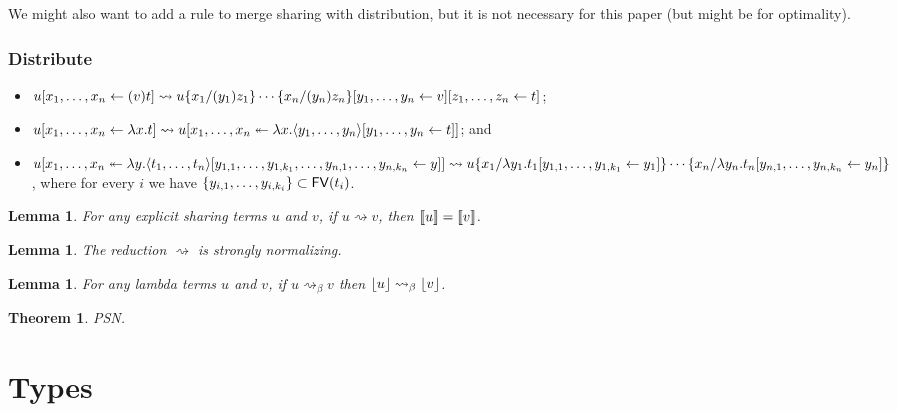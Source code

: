 \documentclass[10pt,a4paper]{article}
\theoremstyle{definition}
\theoremstyle{plain}
\newtheorem{lemma}[definition]{Lemma}
\newtheorem{theorem}[definition]{Theorem}
\theoremstyle{remark}
\begin{document}
We might also want to add a rule to merge sharing with distribution, but it is not necessary for this paper (but might be for optimality).

\subsubsection{Distribute}

\begin{itemize}
 \item ${ { {u}[{{x_1},\dots,{x_n}}\leftarrow{(v)t}] } } \rightsquigarrow {  { { {  { {{{u}\{{x_1}/{(y_1)z_1}\}\cdots\{{x_n}/{(y_n)z_n}\}}}[{{y_1},\dots,{y_n}}\leftarrow{v}] }  } }[{{z_1},\dots,{z_n}}\leftarrow{t}] }  }$;
 \item ${ { {u}[{{x_1},\dots,{x_n}}\leftarrow{\lambda x.t}] } } \rightsquigarrow {  { {u}[{{x_1},\dots,{x_n}}\twoheadleftarrow{\lambda{x}.{ {  { { { {\langle} {y_1},\dots,{y_n} {\rangle} } }[{{y_1},\dots,{y_n}}\leftarrow{t}] }  } }}] }  }$; and
 \item ${ { {u}[{{x_1},\dots,{x_n}}\twoheadleftarrow{\lambda{y}.{ { { { {\langle} {t_1},\dots,{t_n} {\rangle} } }[{y_{1,1},\dots,y_{1,k_1},\dots,y_{n,1},\dots,y_{n,k_n}}\leftarrow{y}] } }}] } }\rightsquigarrow {{u}\{{x_1}/{\lambda y_1. {  { {t_1}[{{y_{1,1}},\dots,{y_{1,k_1}}}\leftarrow{y_1}] }  } }\}\cdots\{{x_n}/{\lambda y_n. {  { {t_n}[{{y_{n,1}},\dots,{y_{n,k_n}}}\leftarrow{y_n}] }  } }\}}$, where for every $i$ we have $\{y_{i,1},\dots,y_{i,k_i}\}\subset{\mathop{\mathsf{FV}}}(t_i)$.
\end{itemize}

\begin{lemma}
For any explicit sharing terms $u$ and $v$, if $u\rightsquigarrow v$, then ${\llbracket{u}\rrbracket}={\llbracket{v}\rrbracket}$.
\end{lemma}

\begin{lemma}
The reduction $\rightsquigarrow$ is strongly normalizing.
\end{lemma}

\begin{lemma}
For any lambda terms $u$ and $v$, if $u\rightsquigarrow_\beta v$ then ${\lfloor{u}\rfloor}\rightsquigarrow_\beta{\lfloor{v}\rfloor}$.
\end{lemma}

\begin{theorem}
PSN.
\end{theorem}

\section{Types}

% 
% 
% 
% 
% 
% 
\end{document}
